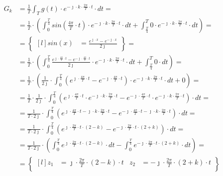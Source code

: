 \begin{task}
\begin{align*}
G_k&=\frac{1}{T}\int_{T}g(t) \cdot e^{-\jmath \cdot k \cdot \frac{2\pi}{T} \cdot t} \cdot dt=\\
&=\frac{1}{T}\cdot\left(\int_{0}^{\frac{T}{4}}sin\left( \frac{4\pi}{T} \cdot t\right) \cdot e^{-\jmath \cdot k \cdot \frac{2\pi}{T} \cdot t} \cdot dt+\int_{\frac{T}{4}}^{T} 0 \cdot e^{-\jmath \cdot k \cdot \frac{2\pi}{T} \cdot t} \cdot dt\right)=\\
&=\begin{Bmatrix*}[l]
sin\left(x\right)&=\frac{e^{\jmath \cdot x}-e^{-\jmath \cdot x}}{2 \jmath }
\end{Bmatrix*}=\\
&=\frac{1}{T}\cdot\left(\int_{0}^{\frac{T}{4}} \frac{e^{\jmath \cdot \frac{4\pi}{T} \cdot t}-e^{-\jmath \cdot \frac{4\pi}{T} \cdot t}}{2\jmath} \cdot e^{-\jmath \cdot k \cdot \frac{2\pi}{T} \cdot t} \cdot dt+\int_{\frac{T}{4}}^{T} 0 \cdot dt\right)=\\
&=\frac{1}{T}\cdot\left(\frac{1}{2\jmath} \cdot \int_{0}^{\frac{T}{4}} \left(e^{\jmath \cdot \frac{4\pi}{T} \cdot t}-e^{-\jmath \cdot \frac{4\pi}{T} \cdot t}\right)\cdot e^{-\jmath \cdot k \cdot \frac{2\pi}{T} \cdot t} \cdot dt + 0\right)=\\
&=\frac{1}{T} \cdot \frac{1}{2\jmath} \cdot \int_{0}^{\frac{T}{4}}
\left( e^{\jmath \cdot \frac{4\pi}{T} \cdot t} \cdot e^{-\jmath \cdot k \cdot \frac{2\pi}{T} \cdot t} - e^{-\jmath \cdot \frac{4\pi}{T} \cdot t} \cdot e^{-\jmath \cdot k \cdot \frac{2\pi}{T} \cdot t} \right) \cdot dt=\\
&=\frac{1}{T\cdot 2\jmath} \cdot \int_{0}^{\frac{T}{4}}
\left(e^{\jmath \cdot \frac{4\pi}{T} \cdot t -\jmath \cdot k \cdot \frac{2\pi}{T} \cdot t} - e^{-\jmath \cdot \frac{4\pi}{T} \cdot t -\jmath \cdot k \cdot \frac{2\pi}{T} \cdot t} \right) \cdot dt=\\
&=\frac{1}{T\cdot 2\jmath} \cdot \int_{0}^{\frac{T}{4}}
\left(e^{\jmath \cdot \frac{2\pi}{T} \cdot t \cdot \left(2 - k\right)} - e^{-\jmath \cdot \frac{2\pi}{T} \cdot t \cdot \left(2+k\right)} \right) \cdot dt=\\
&=\frac{1}{T\cdot 2\jmath} \cdot \left( \int_{0}^{\frac{T}{4}}
e^{\jmath \cdot \frac{2\pi}{T} \cdot t \cdot \left(2 - k\right)} \cdot dt - \int_{0}^{\frac{T}{4}} e^{-\jmath \cdot \frac{2\pi}{T} \cdot t \cdot \left(2+k\right)} \cdot dt \right)=\\
&=\begin{Bmatrix*}[l]
z_1&=\jmath \cdot \frac{2\pi}{T} \cdot \left(2 - k\right)\cdot t &z_2&=-\jmath \cdot \frac{2\pi}{T} \cdot \left(2+k\right)\cdot t\\

\end{Bmatrix*}
\end{align*}
\end{task}
